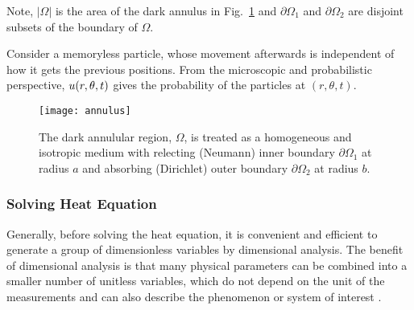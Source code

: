 Note, $|\Omega|$ is the area of the dark annulus in
Fig.~\ref{fig:annulus} and $\partial \Omega_1$ and $\partial \Omega_2$
are disjoint subsets of the boundary of $\Omega$.

Consider a memoryless particle, whose movement afterwards is
independent of how it gets the previous positions. From the
microscopic and probabilistic perspective, $u(r, \theta, t)$ gives the
probability of the particles at $(r,\theta, t)$.




\begin{figure}
  \centering
  \texttt{[image: annulus]}
  \caption{The dark annulular region, $\Omega$, is treated as a homogeneous and isotropic
    medium with relecting (Neumann) inner boundary $\partial \Omega_1$ at radius
    $a$ and absorbing (Dirichlet) outer boundary $\partial \Omega_2$ at radius
    $b$.}\label{fig:annulus}
\end{figure}




\subsubsection{Solving Heat Equation}

Generally, before solving the heat equation, it is convenient and
efficient to generate a group of dimensionless variables by
dimensional analysis. The benefit of dimensional analysis is that many
physical parameters can be combined into a smaller number of unitless
variables, which do not depend on the unit of the measurements and can
also describe the phenomenon or system of interest
\cite{barenblatt1996scaling}.


